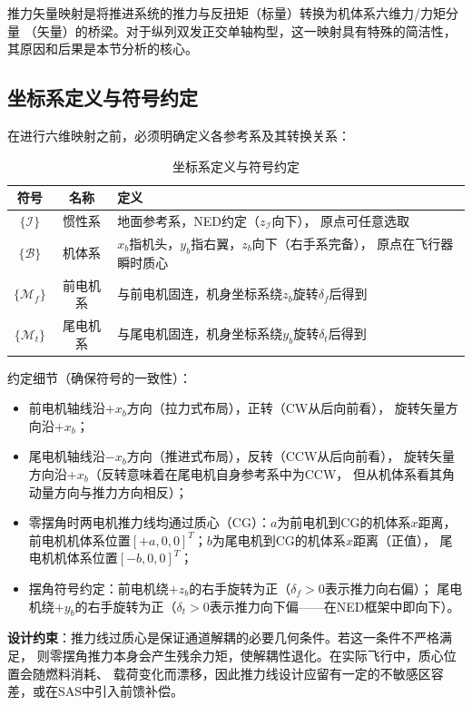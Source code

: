 \documentclass[a4paper,12pt]{ctexart}
\theoremstyle{plain}
\theoremstyle{definition}
\begin{document}
推力矢量映射是将推进系统的推力与反扭矩（标量）转换为机体系六维力/力矩分量
（矢量）的桥梁。对于纵列双发正交单轴构型，这一映射具有特殊的简洁性，
其原因和后果是本节分析的核心。

\subsection{坐标系定义与符号约定}

在进行六维映射之前，必须明确定义各参考系及其转换关系：

\begin{table}[H]
\centering
\caption{坐标系定义与符号约定}
\begin{tabular}{ccl}
\toprule
符号 & 名称 & 定义 \\
\midrule
$\{\mathcal{I}\}$ & 惯性系 & 地面参考系，NED约定（$z_{\mathcal{I}}$向下），
                      原点可任意选取 \\
$\{\mathcal{B}\}$ & 机体系 & $x_b$指机头，$y_b$指右翼，$z_b$向下（右手系完备），
                      原点在飞行器瞬时质心 \\
$\{\mathcal{M}_f\}$ & 前电机系 & 与前电机固连，机身坐标系绕$z_b$旋转$\delta_f$后得到 \\
$\{\mathcal{M}_t\}$ & 尾电机系 & 与尾电机固连，机身坐标系绕$y_b$旋转$\delta_t$后得到 \\
\bottomrule
\end{tabular}
\end{table}

约定细节（确保符号的一致性）：
\begin{itemize}
    \item 前电机轴线沿$+x_b$方向（拉力式布局），正转（CW从后向前看），
          旋转矢量方向沿$+x_b$；
    \item 尾电机轴线沿$-x_b$方向（推进式布局），反转（CCW从后向前看），
          旋转矢量方向沿$+x_b$（反转意味着在尾电机自身参考系中为CCW，
          但从机体系看其角动量方向与推力方向相反）；
    \item 零摆角时两电机推力线均通过质心（CG）：$a$为前电机到CG的机体系$x$距离，
          前电机机体系位置$[+a, 0, 0]^T$；$b$为尾电机到CG的机体系$x$距离（正值），
          尾电机机体系位置$[-b, 0, 0]^T$；
    \item 摆角符号约定：前电机绕$+z_b$的右手旋转为正（$\delta_f > 0$表示推力向右偏）；
          尾电机绕$+y_b$的右手旋转为正（$\delta_t > 0$表示推力向下偏——在NED框架中即向下）。
\end{itemize}

\textbf{设计约束}：推力线过质心是保证通道解耦的必要几何条件。若这一条件不严格满足，
则零摆角推力本身会产生残余力矩，使解耦性退化。在实际飞行中，质心位置会随燃料消耗、
载荷变化而漂移，因此推力线设计应留有一定的不敏感区容差，或在SAS中引入前馈补偿。
\end{document}
